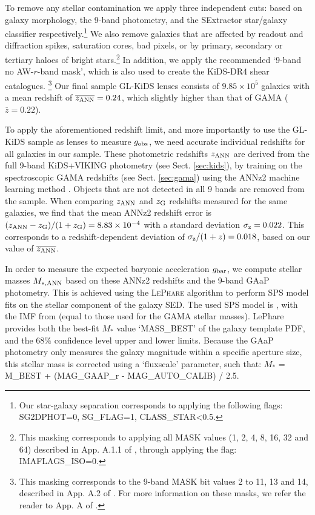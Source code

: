 \documentclass[usenatbib]{mnras}
\newcommand*{\mean}[1]{\overline{#1}}
\newcommand*{\E}[1]{\times 10^{#1}}
\newcommand{\un}[1]{_{\rm #1}}
\begin{document}
To remove any stellar contamination we apply three independent cuts: based on galaxy morphology, the 9-band photometry, and the SExtractor star/galaxy classifier respectively.\footnote{Our star-galaxy separation corresponds to applying the following flags: SG2DPHOT=0, SG\_FLAG=1, CLASS\_STAR<0.5.} We also remove galaxies that are affected by readout and diffraction spikes, saturation cores, bad pixels, or by primary, secondary or tertiary haloes of bright stars.\footnote{This masking corresponds to applying all MASK values (1, 2, 4, 8, 16, 32 and 64) described in App. A.1.1 of \cite{kuijken2019}, through applying the flag: IMAFLAGS\_ISO=0.} In addition, we apply the recommended `9-band no AW-$r$-band mask', which is also used to create the KiDS-DR4 shear catalogues. \footnote{This masking corresponds to the 9-band MASK bit values 2 to 11, 13 and 14, described in App. A.2 of \cite{kuijken2019}. For more information on these masks, we refer the reader to App. A of \cite{kuijken2019}.} Our final sample GL-KiDS lenses consists of $9.85\E{5}$ galaxies with a mean redshift of $\mean{z\un{ANN}}=0.24$, which slightly higher than that of GAMA ($\mean{z}=0.22$).

To apply the aforementioned redshift limit, and more importantly to use the GL-KiDS sample as lenses to measure $g\un{obs}$, we need accurate individual redshifts for all galaxies in our sample. These photometric redshifts $z\un{ANN}$ are derived from the full 9-band KiDS+VIKING photometry (see Sect. \ref{sec:kids}), by training on the spectroscopic GAMA redshifts (see Sect. \ref{sec:gama}) using the ANNz2 machine learning method \cite[]{sadeh2016,dejong2017,bilicki2017}. Objects that are not detected in all 9 bands are removed from the sample. When comparing $z\un{ANN}$ and $z\un{G}$ redshifts measured for the same galaxies, we find that the mean ANNz2 redshift error is $(z\un{ANN} - z\un{G})/(1+z\un{G}) = 8.83\E{-4}$ with a standard deviation $\sigma\un{z} = 0.022$. This corresponds to a redshift-dependent deviation of $\sigma\un{z}/(1+z)=0.018$, based on our value of $\mean{z\un{ANN}}$.

In order to measure the expected baryonic acceleration $g\un{bar}$, we compute stellar masses $M\un{*,ANN}$ based on these ANNz2 redshifts and the 9-band GAaP photometry. This is achieved using the \textsc{LePhare} algorithm \cite[]{arnouts1999, ilbert2006} to perform SPS model fits on the stellar component of the galaxy SED. The used SPS model is \cite{bruzual2003}, with the IMF from \cite{chabrier2003} (equal to those used for the GAMA stellar masses). LePhare provides both the best-fit $M_*$ value `MASS\_BEST' of the galaxy template PDF, and the $68\%$ confidence level upper and lower limits. Because the GAaP photometry only measures the galaxy magnitude within a specific aperture size, this stellar mass is corrected using a `fluxscale' parameter, such that: $M_*$ = M\_BEST + (MAG\_GAAP\_r - MAG\_AUTO\_CALIB) / 2.5.
\end{document}
